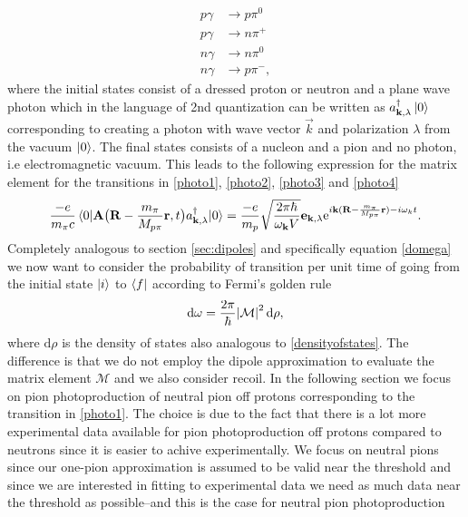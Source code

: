 \begin{align}
	p \gamma & \rightarrow p \pi^0 \label{photo1}\\
	p \gamma & \rightarrow n \pi^+ \label{photo2}\\
	n \gamma & \rightarrow n \pi^0 \label{photo3}\\
	n \gamma & \rightarrow p \pi^- \label{photo4},
\end{align}
where the initial states consist of a dressed proton or neutron and a plane wave photon which in the language of 2nd quantization can be written as $a_{\bm{\mathrm{k}},\lambda}^\dagger \ket{0}$ corresponding to creating a photon with wave vector $\vec{k}$ and polarization $\lambda$ from the vacuum $\ket{0}$. The final states consists of a nucleon and a pion and no photon, i.e electromagnetic vacuum. This leads to the following expression for the matrix element for the transitions in \eqref{photo1}, \eqref{photo2}, \eqref{photo3} and \eqref{photo4}
\begin{equation}\label{transitions}
	\frac{-e}{m_\pi c}\mel*{0}{\bm{\mathrm{A}}\big( \bm{\mathrm{R}}-\frac{m_\pi}{M_{p\pi}}\bm{\mathrm{r}},t\big) a_{\bm{\mathrm{k}},\lambda}^\dagger}{0} = \frac{-e}{m_p} \sqrt{\frac{2\pi \hbar}{\omega_{\bm{\mathrm{k}}}V}} \bm{\mathrm{e}}_{\bm{\mathrm{k}},\lambda}\text{e}^{i\bm{\mathrm{k}}(\bm{\mathrm{R}}-\frac{m_\pi}{M_{p\pi}}\bm{\mathrm{r}})-i\omega_k t}.
\end{equation}
Completely analogous to section \ref{sec:dipoles} and specifically equation \eqref{domega} we now want to consider the probability of transition per unit time of going from the initial state $\ket{i}$ to $\bra{f}$ according to Fermi's golden rule
\begin{equation}
	\text{d}\omega = \frac{2\pi}{\hbar} \abs{\mathcal{M}}^2 \text{d}\rho,
\end{equation}
where $\text{d}\rho$ is the density of states also analogous to \eqref{densityofstates}. The difference is that we do not employ the dipole approximation to evaluate the matrix element $\mathcal{M}$ and we also consider recoil. In the following section we focus on pion photoproduction of neutral pion off protons corresponding to the transition in \eqref{photo1}. The choice is due to the fact that there is a lot more experimental data available for pion photoproduction off protons compared to neutrons since it is easier to achive experimentally. We focus on neutral pions since our one-pion approximation is assumed to be valid near the threshold and since we are interested in fitting to experimental data we need as much data near the threshold as possible--and this is the case for neutral pion photoproduction
